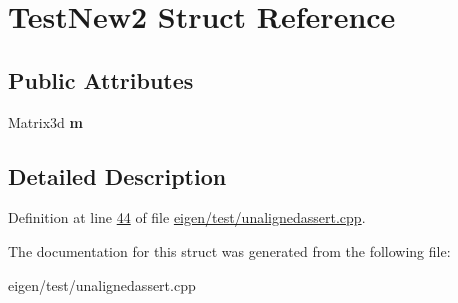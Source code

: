 \hypertarget{struct_test_new2}{}\section{Test\+New2 Struct Reference}
\label{struct_test_new2}
\subsection*{Public Attributes}
\begin{DoxyCompactItemize}
\item 
\mbox{\label{struct_test_new2_a68d478a9c2fb874a72531729ccddaa38}} 
Matrix3d {\bfseries m}
\end{DoxyCompactItemize}


\subsection{Detailed Description}


Definition at line \hyperlink{eigen_2test_2unalignedassert_8cpp_source_l00044}{44} of file \hyperlink{eigen_2test_2unalignedassert_8cpp_source}{eigen/test/unalignedassert.\+cpp}.



The documentation for this struct was generated from the following file\+:\begin{DoxyCompactItemize}
\item 
eigen/test/unalignedassert.\+cpp\end{DoxyCompactItemize}
